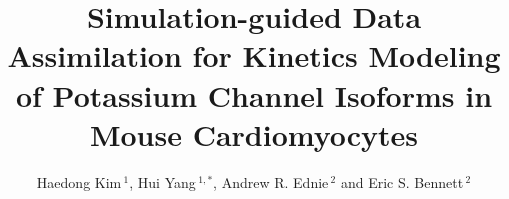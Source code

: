 \documentclass[utf8]{frontiersHLTH} %
\def\firstAuthorLast{H. Kim {et~al.}} %
\def\Authors{Haedong Kim\,$^{1}$, Hui Yang\,$^{1,*}$, Andrew R. Ednie\,$^{2}$ and Eric S. Bennett\,$^{2}$}
\begin{document}
\onecolumn
{}

\title[Simulation-guided Data Assimilation of K\textsubscript{v}]{Simulation-guided Data Assimilation for Kinetics Modeling of Potassium Channel Isoforms in Mouse Cardiomyocytes} 

\author[\firstAuthorLast ]{\Authors} %
\address{} %
\correspondance{} %

\extraAuth{}%


\maketitle
\end{document}
